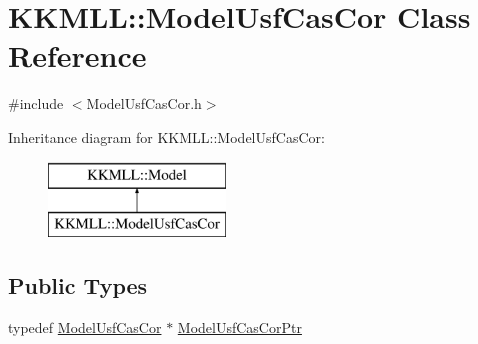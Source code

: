\hypertarget{class_k_k_m_l_l_1_1_model_usf_cas_cor}{}\section{K\+K\+M\+LL\+:\+:Model\+Usf\+Cas\+Cor Class Reference}
\label{class_k_k_m_l_l_1_1_model_usf_cas_cor}


{\ttfamily \#include $<$Model\+Usf\+Cas\+Cor.\+h$>$}

Inheritance diagram for K\+K\+M\+LL\+:\+:Model\+Usf\+Cas\+Cor\+:\begin{figure}[H]
\begin{center}
\leavevmode
\includegraphics[height=2.000000cm]{class_k_k_m_l_l_1_1_model_usf_cas_cor}
\end{center}
\end{figure}
\subsection*{Public Types}
\begin{DoxyCompactItemize}
\item 
typedef \hyperlink{class_k_k_m_l_l_1_1_model_usf_cas_cor}{Model\+Usf\+Cas\+Cor} $\ast$ \hyperlink{class_k_k_m_l_l_1_1_model_usf_cas_cor_a42b54852ed4915fd762eb8c0bb5df39b}{Model\+Usf\+Cas\+Cor\+Ptr}
\end{DoxyCompactItemize}
